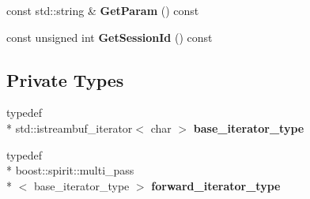 \begin{DoxyCompactItemize}
\item 
\hypertarget{classhttp__server_1_1cRequest_a386946841d675edc9dbf5fd81d8de046}{const std\-::string \& {\bfseries Get\-Param} () const }\label{classhttp__server_1_1cRequest_a386946841d675edc9dbf5fd81d8de046}

\item 
\hypertarget{classhttp__server_1_1cRequest_ada8f38975ca9bb05bfe9b5b34aa985a5}{const unsigned int {\bfseries Get\-Session\-Id} () const }\label{classhttp__server_1_1cRequest_ada8f38975ca9bb05bfe9b5b34aa985a5}

\end{DoxyCompactItemize}
\subsection*{Private Types}
\begin{DoxyCompactItemize}
\item 
\hypertarget{classhttp__server_1_1cRequest_ab55878881ea0fad5b7801a7d3e67bc6f}{typedef \\*
std\-::istreambuf\-\_\-iterator$<$ char $>$ {\bfseries base\-\_\-iterator\-\_\-type}}\label{classhttp__server_1_1cRequest_ab55878881ea0fad5b7801a7d3e67bc6f}

\item 
\hypertarget{classhttp__server_1_1cRequest_a4c4ef5da2042acec5d8f9ff9f0a432c3}{typedef \\*
boost\-::spirit\-::multi\-\_\-pass\\*
$<$ base\-\_\-iterator\-\_\-type $>$ {\bfseries forward\-\_\-iterator\-\_\-type}}\label{classhttp__server_1_1cRequest_a4c4ef5da2042acec5d8f9ff9f0a432c3}

\end{DoxyCompactItemize}
